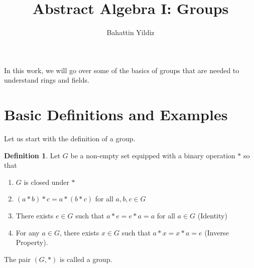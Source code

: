 \documentclass[12pt]{article}
\title{Abstract Algebra I: Groups}
\author{Bahattin Yildiz }
\date{}
\theoremstyle{plain}
\theoremstyle{definition}
\newtheorem{definition}{Definition}
\theoremstyle{remark}
\begin{document}
\maketitle
In this work, we will go over some of the basics of groups that are needed to understand rings and fields.

\section{Basic Definitions and Examples}
Let us start with the definition of a group.
\begin{definition}
Let $G$ be a non-empty set equipped with a binary operation $*$ so that
\begin{enumerate}
    \item $G$ is closed under $*$
    \item $(a*b)*c=a*(b*c)$ for all $a,b,c \in G$
    \item There exists $e\in G$ such that $a*e=e*a=a$ for all $a \in G$ (Identity)
    \item For any $a\in G$, there exists $x\in G$ such that $a*x=x*a=e$ (Inverse Property).
\end{enumerate}
The pair $(G, *)$ is called a group.
\end{definition}
\end{document}
